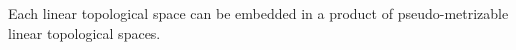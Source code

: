 Each linear topological space can be embedded in a product of pseudo-metrizable linear topological spaces.
